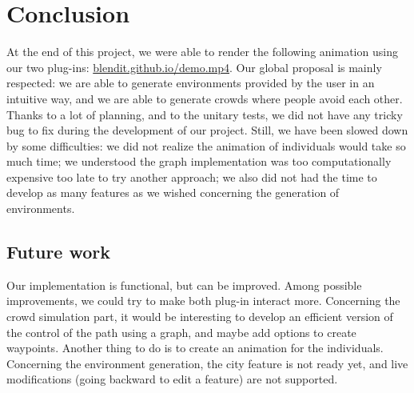 \section{Conclusion}

At the end of this project, we were able to render the following animation using our two plug-ins: \url{blendit.github.io/demo.mp4}. Our global proposal is mainly respected: we are able to generate environments provided by the user in an intuitive way, and we are able to generate crowds where people avoid each other. Thanks to a lot of planning, and to the unitary tests, we did not have any tricky bug to fix during the development of our project. Still, we have been slowed down by some difficulties: we did not realize the animation of individuals would take so much time;  we understood the graph implementation was too computationally expensive too late to try another approach; we also did not had the time to develop as many features as we wished concerning the generation of environments. 

\subsection*{Future work}

Our implementation is functional, but can be improved. Among possible improvements, we could try to make both plug-in interact more. Concerning the crowd simulation part, it would be interesting to develop an efficient version of the control of the path using a graph, and maybe add options to create waypoints. Another thing to do is to create an animation for the individuals. Concerning the environment generation, the city feature is not ready yet, and live modifications (going backward to edit a feature) are not supported.

